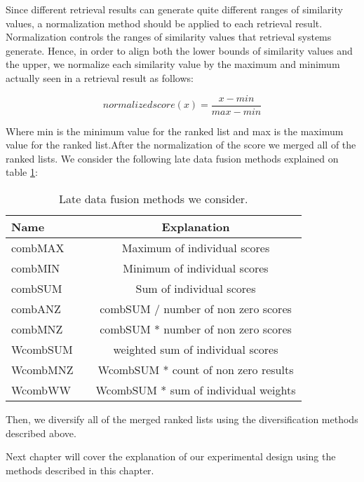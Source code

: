 Since different retrieval results can generate quite different ranges of similarity values, a normalization
method should be applied to each retrieval result. Normalization controls the ranges of similarity values that retrieval systems generate. Hence, in order to align both the lower bounds of similarity values and the upper, we normalize each similarity value
by the maximum and minimum actually seen in a retrieval result as follows:

\begin{equation}
normalized score(x) = \frac{x-min}{max-min}
\end{equation}

Where min is the minimum value for the ranked list and max is the maximum value for the ranked list.After the normalization of the score we merged all of the ranked lists. We consider the following late data fusion methods explained on table \ref{table:LDFmethods}:
\bigskip

\begin{table}[H]
\begin{center}
\caption{Late data fusion methods we consider.}
\label{table:LDFmethods}
\begin{tabular}{lcc}
\midrule
Name &   & Explanation \\
\midrule
combMAX &   & Maximum of individual scores \\
combMIN &   & Minimum of individual scores \\
combSUM &   & Sum of individual scores \\
combANZ &   & combSUM / number of non zero scores \\
combMNZ &   & combSUM * number of non zero scores \\
WcombSUM &   & weighted sum of individual scores \\
WcombMNZ &   & WcombSUM * count of non zero results \\
WcombWW &   & WcombSUM * sum of individual weights \\
\bottomrule
\end{tabular}
\end{center}
\end{table}

Then, we diversify all of the merged ranked lists using the diversification methods described above.

Next chapter will cover the explanation of our experimental design using the methods described in this chapter.